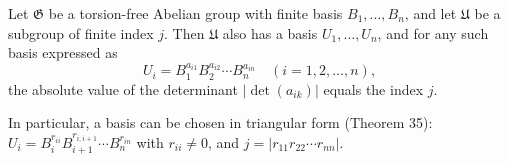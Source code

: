 Let $\mathfrak{G}$ be a torsion-free Abelian group with finite basis $B_1, \ldots, B_n$, and let $\mathfrak{U}$ be a subgroup of finite index $j$. Then $\mathfrak{U}$ also has a basis $U_1, \ldots, U_n$, and for any such basis expressed as
$$U_i = B_1^{a_{i1}} B_2^{a_{i2}} \cdots B_n^{a_{in}} \quad (i = 1, 2, \ldots, n),$$
the absolute value of the determinant $|\det(a_{ik})|$ equals the index $j$.

In particular, a basis can be chosen in triangular form (Theorem 35): $U_i = B_i^{r_{ii}} B_{i+1}^{r_{i,i+1}} \cdots B_n^{r_{in}}$ with $r_{ii} \neq 0$, and $j = |r_{11} r_{22} \cdots r_{nn}|$.
